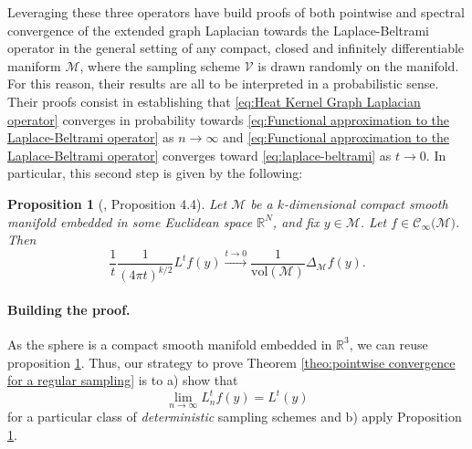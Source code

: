\documentclass{article} %
\newtheorem{definition}{Definition}[section]
\newtheorem{prop}{Proposition}
\newcommand{\V}{\mathcal{V}}  %
\begin{document}
Leveraging these three operators \cite{belkin2005towards, belkin2007convergence} have build proofs of both pointwise and spectral convergence of the extended graph Laplacian towards the Laplace-Beltrami operator in the general setting of any compact, closed and infinitely differentiable maniform $\mathcal M$, where the sampling scheme $\V$ is drawn randomly on the manifold. For this reason, their results are all to be interpreted in a probabilistic sense.
Their proofs consist in establishing that \eqref{eq:Heat Kernel Graph Laplacian operator} converges in probability towards \eqref{eq:Functional approximation to the Laplace-Beltrami operator} as $n\rightarrow \infty$ and \eqref{eq:Functional approximation to the Laplace-Beltrami operator} converges toward \eqref{eq:laplace-beltrami} as $t\rightarrow 0$. In particular, this second step is given by the following:
\begin{prop}
[\cite{belkin2005towards}, Proposition 4.4]
Let $\mathcal{M}$ be a $k$-dimensional compact smooth manifold embedded in some Euclidean space $\mathbb{R}^N$, and fix $y\in\mathcal{M}$. Let $f\in\mathcal{C}_\infty(\mathcal{M)}$. Then
\begin{equation}
\frac{1}{t}\frac{1}{(4\pi t)^{k/2}} L^tf(y) \xrightarrow{t\to 0 } \frac{1}{\text{vol}(\mathcal M)}\Delta_{\mathcal M}f(y).
\end{equation}
\label{prop:3}
\end{prop}

\paragraph{Building the proof.}
As the sphere is a compact smooth manifold embedded in $\mathbb{R}^3$, we can reuse proposition \ref{prop:3}. Thus, our strategy to prove Theorem \ref{theo:pointwise convergence for a regular sampling} is to a) show that
\begin{equation}\label{eq:continuous convergence}
 \lim_{n\to\infty}L_n^{t} f(y) =  L^t(y)
\end{equation}
for a particular class of \emph{deterministic} sampling schemes and b) apply Proposition \ref{prop:3}.


\end{document}
